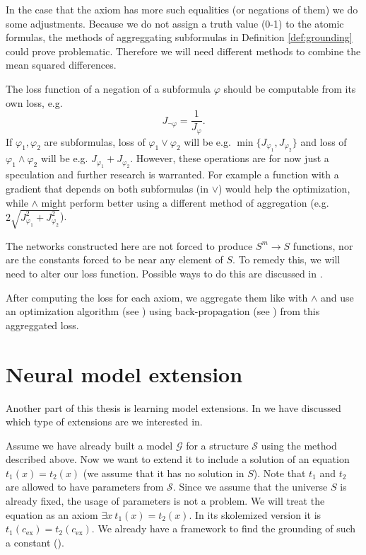 In the case that the axiom has more such equalities (or negations of them) we do some adjustments. Because we do not assign a truth value (0-1) to the atomic formulas, the methods of aggreggating subformulas in Definition \autoref{def:grounding} could prove problematic. Therefore we will need different methods to combine the mean squared differences.

The loss function of a negation of a subformula $\varphi$ should be computable from its own loss, e.g. $$J_{\neg\varphi}=\frac{1}{J_{\varphi}}.$$ If $\varphi_1,\varphi_2$ are subformulas, loss of $\varphi_1\vee \varphi_2$ will be e.g. $\min\{J_{\varphi_1},J_{\varphi_2}\}$ and loss of $\varphi_1\wedge \varphi_2$ will be e.g. $J_{\varphi_1}+J_{\varphi_2}$. However, these operations are for now just a speculation and further research is warranted. For example a function with a gradient that depends on both subformulas (in $\vee$) would help the optimization, while $\wedge$ might perform better using a different method of aggregation (e.g. $2\sqrt{J_{\varphi_1}^2+J_{\varphi_2}^2}$).

The networks constructed here are not forced to produce $S^m\rightarrow S$ functions, nor are the constants forced to be near any element of $S$. To remedy this, we will need to alter our loss function. Possible ways to do this are discussed in .

After computing the loss for each axiom, we aggregate them like with $\wedge$ and use an optimization algorithm (see ) using back-propagation (see ) from this aggreggated loss.

\section{Neural model extension}
Another part of this thesis is learning model extensions. In  we have discussed which type of extensions are we interested in.

Assume we have already built a model $\mathcal{G}$ for a structure $\mathcal{S}$ using the method described above. Now we want to extend it to include a solution of an equation $t_1(x)=t_2(x)$ (we assume that it has no solution in $S$). Note that $t_1$ and $t_2$ are allowed to have parameters from $\mathcal{S}$. Since we assume that the universe $S$ is already fixed, the usage of parameters is not a problem. We will treat the equation as an axiom $\exists x\ t_1(x)=t_2(x)$. In its skolemized version it is $t_1(c_{\text{ex}})= t_2(c_{\text{ex}})$. We already have a framework to find the grounding of such a constant ().


